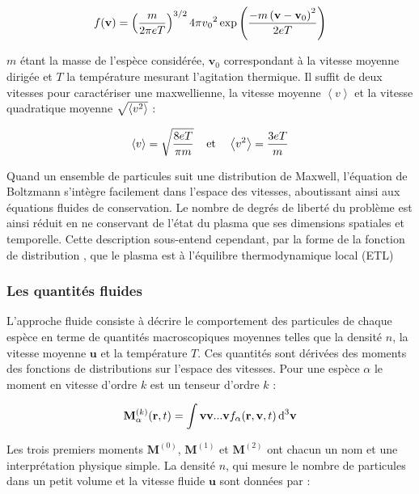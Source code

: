 \begin{refsection}
\begin{equation}
\label{1-MaxwellDistribution}
	f(\mathbf{v})=
	\left(\frac{m}{2\pi
	eT}\right)^{{3/2}}4\pi v{_{0}}^{{2}}\exp\left(\frac{-m
	\left(\mathbf v-\mathbf v{_{0}}\right)^{{2}}}{2eT}\right)
\end{equation}

$m$ étant la masse de l'espèce considérée, $\mathbf v_0$ correspondant à la
vitesse moyenne dirigée et $T$ la température mesurant l'agitation
thermique. Il suffit de deux vitesses pour caractériser une maxwellienne, la
vitesse moyenne $\left<v\right>$ et la vitesse quadratique moyenne
$\sqrt{\left<v^{{2}}\right>}$ :

\begin{equation}
\label{1-EnergyFluxDensity}
	\left<v\right>=\sqrt{\frac{8eT}{\pi m}} \;\;\;\;\text{et}\;\;\;\; 
	\left<v^{{2}}\right>=\frac{3eT}{m}
\end{equation}

Quand un ensemble de particules suit une distribution
de Maxwell, l'équation de Boltzmann s'intègre facilement dans l'espace des
vitesses, aboutissant ainsi aux équations fluides de conservation. Le nombre de
degrés de liberté du problème est ainsi réduit en ne conservant de l'état du plasma
que ses dimensions spatiales et temporelle.
Cette description sous-entend cependant, par la forme de la fonction de
distribution , que le plasma est à l'équilibre
thermodynamique local (ETL)

\subsubsection{Les quantités fluides}
L'approche fluide consiste à décrire le comportement des particules de chaque
espèce en terme de quantités macroscopiques moyennes telles que la densité $n$,
la vitesse moyenne $\mathbf u$ et la température $T$. Ces quantités sont dérivées
des moments des fonctions de distributions sur l'espace des vitesses.
Pour une espèce $\alpha$ le moment en vitesse d'ordre $k$ est un tenseur d'ordre
$k$ :

\begin{equation}
\mathbf M^{(k)}_\alpha(\mathbf
r,t)=\int\mathbf{v} \mathbf{v} . . .
\mathbf{v} f_\alpha(\mathbf r,\mathbf v,t)
\,\text{d}^{{3}}\mathbf{v}
\end{equation}

Les trois premiers moments $\mathbf M^{(0)}$, $\mathbf M^{(1)}$ et $\mathbf
M^{(2)}$ ont chacun un nom et une interprétation physique simple. La densité $n$, qui
mesure le nombre de particules dans un petit volume et la vitesse fluide
$\mathbf u$ sont données par :


\end{refsection}
